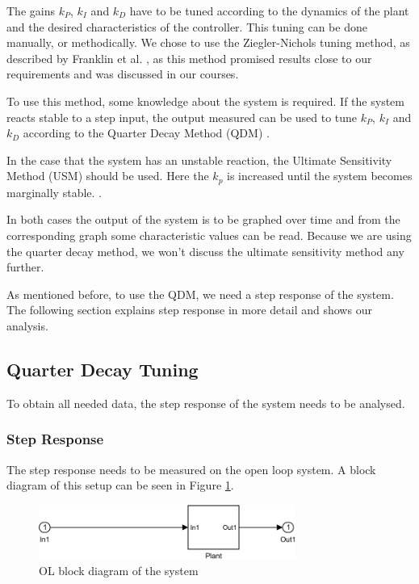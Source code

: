 The gains $k_P$, $k_I$ and $k_D$ have to be tuned according to the dynamics of the plant
and the desired characteristics of the controller.
This tuning can be done manually, or methodically.
We chose to use the Ziegler-Nichols tuning method,
as described by Franklin et al. \cite{Franklin2014},
as this method promised results close to our requirements and was discussed in our courses.

To use this method, some knowledge about the system is required.
If the system reacts stable to a step input,
the output measured can be used to tune $k_P$, $k_I$ and $k_D$ according to the Quarter Decay Method (QDM)
\cite{Franklin2014}.

In the case that the system has an unstable reaction,
the Ultimate Sensitivity Method (USM) should be used.
Here the $k_p$ is increased until the system becomes marginally stable.
\cite{Franklin2014}.

In both cases the output of the system is to be graphed over time
and from the corresponding graph some characteristic values can be read.
Because we are using the quarter decay method,
we won't discuss the ultimate sensitivity method any further.

As mentioned before,
to use the QDM, we need a step response of the system.
The following section explains step response in more detail and shows our analysis.

\subsection{Quarter Decay Tuning}\label{sub:quadec}
To obtain all needed data, the step response of the system
needs to be analysed.

\subsubsection{Step Response}
The step response needs to be measured on the open loop system.
A block diagram of this setup can be seen in Figure \ref{fig:OL}.

\begin{figure}[H]
    \centering
    \includegraphics[width=0.75\textwidth]{figures/07controllerDesign/OLblock.pdf}
    \caption{OL block diagram of the system}
\label{fig:OL}
\end{figure}

